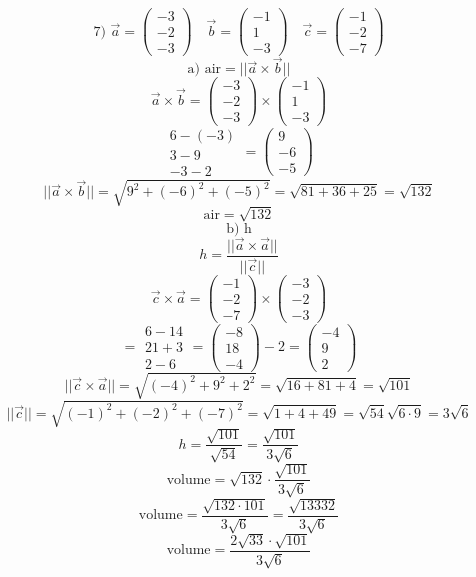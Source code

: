\documentclass{article}
\begin{document}
\[ \text{7) } \vec{a} = \begin{pmatrix} -3 \\ -2 \\ -3 \end{pmatrix} \quad \vec{b} = \begin{pmatrix} -1 \\ 1 \\ -3 \end{pmatrix} \quad \vec{c} = \begin{pmatrix} -1 \\ -2 \\ -7 \end{pmatrix} \]
\[ \text{a) air} = ||\vec{a} \times \vec{b}|| \]
\[ \vec{a} \times \vec{b} = \begin{pmatrix} -3 \\ -2 \\ -3 \end{pmatrix} \times \begin{pmatrix} -1 \\ 1 \\ -3 \end{pmatrix} \]
\[ \begin{array}{c} 6 - (-3) \\ 3 - 9 \\ -3 - 2 \end{array} = \begin{pmatrix} 9 \\ -6 \\ -5 \end{pmatrix} \]
\[ ||\vec{a} \times \vec{b}|| = \sqrt{9^2 + (-6)^2 + (-5)^2} = \sqrt{81 + 36 + 25} = \sqrt{132} \]
\[ \text{air} = \sqrt{132} \]
\[ \text{b) h} \]
\[ h = \frac{||\vec{a} \times \vec{a}||}{||\vec{c}||} \]
\[ \vec{c} \times \vec{a} = \begin{pmatrix} -1 \\ -2 \\ -7 \end{pmatrix} \times \begin{pmatrix} -3 \\ -2 \\ -3 \end{pmatrix} \]
\[ = \begin{array}{c} 6 - 14 \\ 21 + 3 \\ 2 - 6 \end{array} = \begin{pmatrix} -8 \\ 18 \\ -4 \end{pmatrix} -2 = \begin{pmatrix} -4 \\ 9 \\ 2 \end{pmatrix} \]
\[ ||\vec{c} \times \vec{a}|| = \sqrt{(-4)^2 + 9^2 + 2^2} = \sqrt{16 + 81 + 4} = \sqrt{101} \]
\[ ||\vec{c}|| = \sqrt{(-1)^2 + (-2)^2 + (-7)^2} = \sqrt{1 + 4 + 49} = \sqrt{54} \sqrt{6 \cdot 9} = 3\sqrt{6} \]
\[ h = \frac{\sqrt{101}}{\sqrt{54}} = \frac{\sqrt{101}}{3\sqrt{6}} \]
\[ \text{volume} = \sqrt{132} \cdot \frac{\sqrt{101}}{3\sqrt{6}} \]
\[ \text{volume} = \frac{\sqrt{132 \cdot 101}}{3\sqrt{6}} = \frac{\sqrt{13332}}{3\sqrt{6}} \]
\[ \text{volume} = \frac{2\sqrt{33} \cdot \sqrt{101}}{3\sqrt{6}} \]
\end{document}
